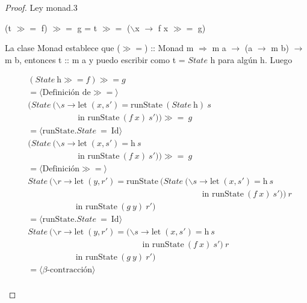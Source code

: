 \documentclass[a4paper,12pt]{article}
\begin{document}
\newpage
\begin{proof}
Ley monad.3
\begin{center}
 (t $\gg=$ f) $\gg=$ g \; = \; t $\gg=$ ($\backslash$x $\to$ f x  $\gg=$ g)
\end{center}

La clase Monad establece que ($\gg=$) :: Monad m $\Rightarrow$ m a $\to$ (a $\to$ m b) $\to$ m b,
entonces t :: m a y  puedo escribir como t = $State$ h para algún h. Luego

\begin{fleqn}
\begin{equation} 
\begin{split}
  & (State \ \mbox{h} \gg= f) \gg= g\\
  & =\langle \mbox{Definición de}\gg= \rangle \\
  & (State \ (\backslash s \to \mbox{let} \; (x,s') = \mbox{runState} \ (State \ \mbox{h}) \ s \\
  & \hspace{71pt} \mbox{in  runState} \ (f \ x) \ s')) \gg=  \ g \\
  & =\langle \mbox{runState}.State \ = \ \mbox{Id}  \rangle \\
  & (State \ (\backslash s \to \mbox{let} \; (x,s') =  \mbox{h} \ s \\
  & \hspace{71pt} \mbox{in  runState} \ (f \ x) \ s')) \gg=  \ g \\
  & =\langle \mbox{Definición} \gg=  \rangle \\
  & State \ (\backslash r \to \mbox{let} \; (y,r') = \mbox{runState} \ (State \ (\backslash s \to \mbox{let} \; (x,s') = \mbox{h} \ s \\
  & \hspace{248pt} \mbox{in  runState} \ (f \ x) \ s')) \ r \\
  & \hspace{68pt} \mbox{in  runState} \ (g \ y) \ r' )\\
  & =\langle \mbox{runState}.State \ = \ \mbox{Id}  \rangle \\
  & State \ (\backslash r \to \mbox{let} \; (y,r') = (\backslash s \to \mbox{let} \; (x,s') = \mbox{h} \ s \\
  & \hspace{163pt} \mbox{in  runState} \ (f \ x) \ s') \ r\\
  & \hspace{68pt} \mbox{in  runState} \ (g \ y) \ r' )\\
  & =\langle \beta \mbox{-contracción}  \rangle \\

\end{split}
\end{equation}
\end{fleqn}
\end{proof}
\end{document}

